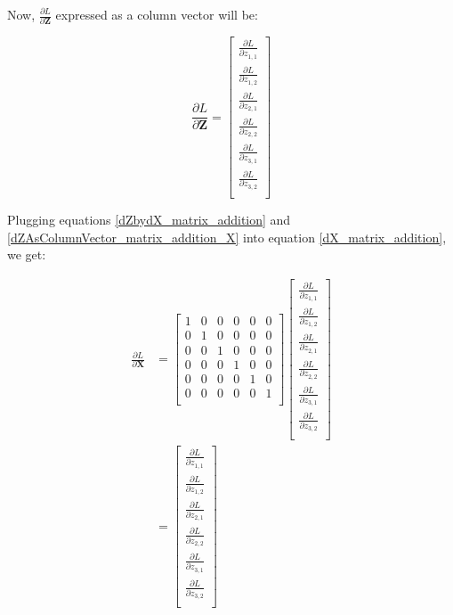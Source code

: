 \documentclass{article}
\newcommand{\matr}[1]{\mathbf{#1}} %
\begin{document}
Now, $\frac{\partial L}{\partial \matr{Z}}$ expressed as a column vector will be:

\begin{equation} \label{dZAsColumnVector_matrix_addition_X}
\frac{\partial L}{\partial \matr{Z}} =
\begin{bmatrix}
\frac{\partial L}{\partial z_{1,1}} \\[0.7em]
\frac{\partial L}{\partial z_{1,2}} \\[0.7em]
\frac{\partial L}{\partial z_{2,1}} \\[0.7em]
\frac{\partial L}{\partial z_{2,2}} \\[0.7em]
\frac{\partial L}{\partial z_{3,1}} \\[0.7em]
\frac{\partial L}{\partial z_{3,2}} \\[0.7em]
\end{bmatrix}
\end{equation}

Plugging equations \ref{dZbydX_matrix_addition} and \ref{dZAsColumnVector_matrix_addition_X} into equation \ref{dX_matrix_addition}, we get:

\begin{align}
\frac{\partial L}{\partial \matr{X}} &=
\begin{bmatrix}
1 & 0 & 0 & 0 & 0 & 0 \\%
0 & 1 & 0 & 0 & 0 & 0 \\%
0 & 0 & 1 & 0 & 0 & 0 \\%
0 & 0 & 0 & 1 & 0 & 0 \\%
0 & 0 & 0 & 0 & 1 & 0 \\%
0 & 0 & 0 & 0 & 0 & 1 \\%
\end{bmatrix}
\begin{bmatrix}
\frac{\partial L}{\partial z_{1,1}} \\[0.7em]
\frac{\partial L}{\partial z_{1,2}} \\[0.7em]
\frac{\partial L}{\partial z_{2,1}} \\[0.7em]
\frac{\partial L}{\partial z_{2,2}} \\[0.7em]
\frac{\partial L}{\partial z_{3,1}} \\[0.7em]
\frac{\partial L}{\partial z_{3,2}} \\[0.7em]
\end{bmatrix}
\nonumber \\
&=
\begin{bmatrix}
\frac{\partial L}{\partial z_{1,1}} \\[0.7em]
\frac{\partial L}{\partial z_{1,2}} \\[0.7em]
\frac{\partial L}{\partial z_{2,1}} \\[0.7em]
\frac{\partial L}{\partial z_{2,2}} \\[0.7em]
\frac{\partial L}{\partial z_{3,1}} \\[0.7em]
\frac{\partial L}{\partial z_{3,2}} \\[0.7em]
\end{bmatrix} \label{dXAsColumnVector_matrix_addition}
\end{align}
\end{document}
